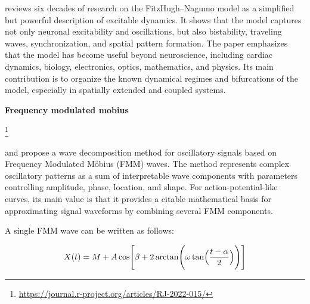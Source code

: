 \documentclass{book}
\providecommand{\ProjectDeepHeading}[2]{%
    \par\medskip\noindent\textbf{#2}\par\smallskip
}
\providecommand{\seeherefooter}[1]{\footnote{\url{#1}}}
\begin{document}
    \cite{cebrian-lacasa-2025-six-decades-of-the-fitzhugh-nagumo-model-a-guide-through-its-spatio-temporal-dynamics-and-influence-across-disciplines}
    reviews six decades of research on the FitzHugh--Nagumo model as a simplified but powerful description of excitable dynamics.
    It shows that the model captures not only neuronal excitability and oscillations, but also bistability, traveling waves, synchronization, and spatial pattern formation.
    The paper emphasizes that the model has become useful beyond neuroscience, including cardiac dynamics, biology, electronics, optics, mathematics, and physics.
    Its main contribution is to organize the known dynamical regimes and bifurcations of the model, especially in spatially extended and coupled systems.

\ProjectDeepHeading{7}{Frequency modulated mobius}


\seeherefooter{https://journal.r-project.org/articles/RJ-2022-015/}
    
    \cite{rueda-2021-a-novel-wave-decomposition-for-oscillatory-signals}
    and
    \cite{rodriguez-collado-2021-identification-of-action-potential-waveforms}
    propose a wave decomposition method for oscillatory signals based on Frequency Modulated M\"obius (FMM) waves.
    The method represents complex oscillatory patterns as a sum of interpretable wave components with parameters controlling amplitude, phase, location, and shape.
    For action-potential-like curves, its main value is that it provides a citable mathematical basis for approximating signal waveforms by combining several FMM components.
    
    A single FMM wave can be written as follows:
    
    \begin{equation}
        X(t)
        =
        M
        +
        A
        \cos
        \Biggl[
            \ensuremath{\beta}
            +
            2
            \arctan
            \Biggl(
            \ensuremath{\omega}
            \tan
            \Bigl(
            \frac{t-\ensuremath{\alpha}}{2}
            \Bigr)
            \Biggr)
            \Biggr]
    \end{equation}
    
\end{document}
